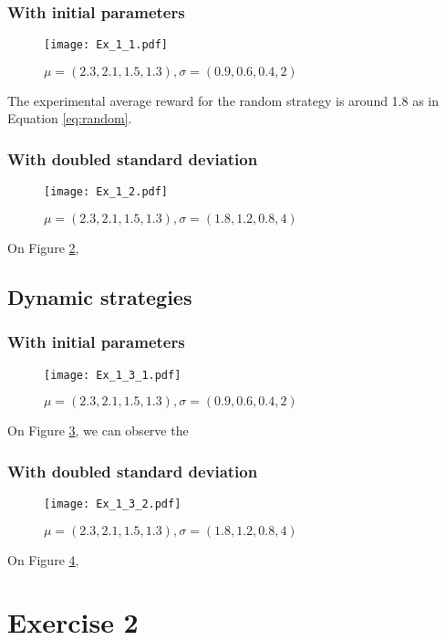 \documentclass[a4paper,11pt]{article}
\begin{document}
\subsubsection{With initial parameters}
\begin{figure}[H]
  \center
  \texttt{[image: Ex\_1\_1.pdf]}
  \caption{\label{fig:1.1} $\mu = (2.3, 2.1, 1.5, 1.3), \sigma = (0.9, 0.6, 0.4, 2)$}
\end{figure}

The experimental average reward for the random strategy is around 1.8 as in Equation \ref{eq:random}.

\subsubsection{With doubled standard deviation}
\begin{figure}[H]
  \center
  \texttt{[image: Ex\_1\_2.pdf]}
  \caption{\label{fig:1.2} $\mu = (2.3, 2.1, 1.5, 1.3), \sigma = (1.8, 1.2, 0.8, 4)$}
\end{figure}

On Figure \ref{fig:1.2},

\subsection{Dynamic strategies}
\subsubsection{With initial parameters}
\begin{figure}[H]
  \center
  \texttt{[image: Ex\_1\_3\_1.pdf]}
  \caption{\label{fig:1.3.1} $\mu = (2.3, 2.1, 1.5, 1.3), \sigma = (0.9, 0.6, 0.4, 2)$}
\end{figure}

On Figure \ref{fig:1.3.1}, we can observe the 

\subsubsection{With doubled standard deviation}
\begin{figure}[H]
  \center
  \texttt{[image: Ex\_1\_3\_2.pdf]}
  \caption{\label{fig:1.3.2} $\mu = (2.3, 2.1, 1.5, 1.3), \sigma = (1.8, 1.2, 0.8, 4)$}
\end{figure}

On Figure \ref{fig:1.3.2},

\section{Exercise 2}
\end{document}
